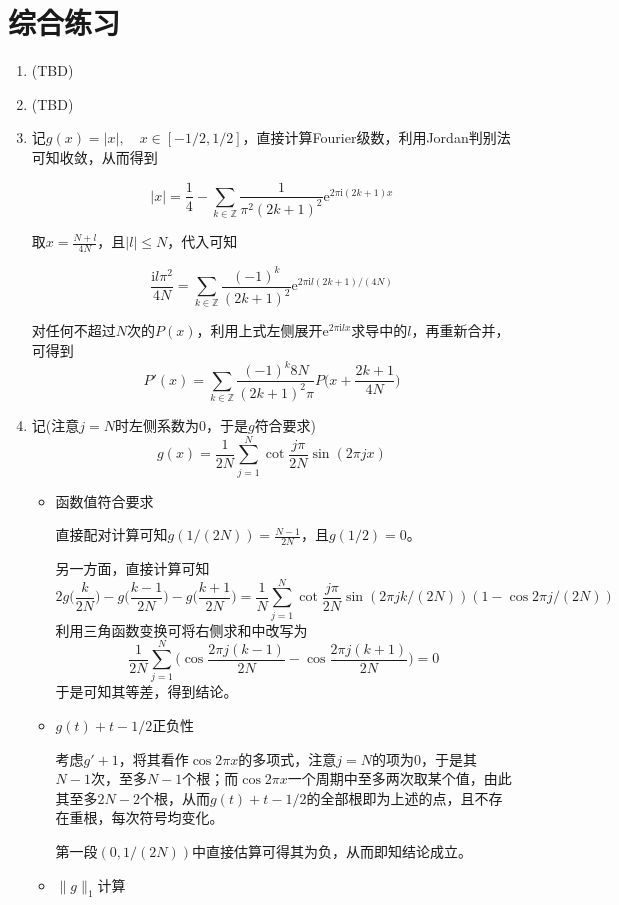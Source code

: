 \documentclass[a4paper,UTF8,fontset=windows]{ctexart}
\newcommand*{\er}{\mathrm{e}}
\newcommand*{\ir}{\mathrm{i}}
\begin{document}
\section{综合练习}
\begin{enumerate}
    \item (TBD)
    \item (TBD)
    \item 记$g(x)=|x|,\quad x\in[-1/2,1/2]$，直接计算Fourier级数，利用Jordan判别法可知收敛，从而得到

    $$|x|=\frac{1}{4}-\sum_{k\in\mathbb{Z}}\frac{1}{\pi^2(2k+1)^2}\er^{2\pi\ir(2k+1)x}$$

    取$x=\frac{N+l}{4N}$，且$|l|\le N$，代入可知

    $$\frac{\ir l\pi^2}{4N}=\sum_{k\in\mathbb{Z}}\frac{(-1)^k}{(2k+1)^2}\er^{2\pi\ir l(2k+1)/(4N)}$$

    对任何不超过$N$次的$P(x)$，利用上式左侧展开$\er^{2\pi\ir lx}$求导中的$l$，再重新合并，可得到
    $$P'(x)=\sum_{k\in\mathbb{Z}}\frac{(-1)^k8N}{(2k+1)^2\pi}P\bigg(x+\frac{2k+1}{4N}\bigg)$$
    
    \item 记(注意$j=N$时左侧系数为0，于是$g$符合要求)
    $$g(x)=\frac{1}{2N}\sum_{j=1}^N\cot\frac{j\pi}{2N}\sin(2\pi jx)$$

    \begin{itemize}
        \item 函数值符合要求
        
        直接配对计算可知$g(1/(2N))=\frac{N-1}{2N}$，且$g(1/2)=0$。

        另一方面，直接计算可知
        $$2g\bigg(\frac{k}{2N}\bigg)-g\bigg(\frac{k-1}{2N}\bigg)-g\bigg(\frac{k+1}{2N}\bigg)=\frac{1}{N}\sum_{j=1}^N\cot\frac{j\pi}{2N}\sin(2\pi j k/(2N))(1-\cos2\pi j/(2N))$$
        利用三角函数变换可将右侧求和中改写为
        $$\frac{1}{2N}\sum_{j=1}^N\bigg(\cos\frac{2\pi j(k-1)}{2N}-\cos\frac{2\pi j(k+1)}{2N}\bigg)=0$$
        于是可知其等差，得到结论。

        \item $g(t)+t-1/2$正负性
        
        考虑$g'+1$，将其看作$\cos2\pi x$的多项式，注意$j=N$的项为0，于是其$N-1$次，至多$N-1$个根；而$\cos 2\pi x$一个周期中至多两次取某个值，由此其至多$2N-2$个根，从而$g(t)+t-1/2$的全部根即为上述的点，且不存在重根，每次符号均变化。
        
        第一段$(0,1/(2N))$中直接估算可得其为负，从而即知结论成立。

        \item $\|g\|_1$计算
        

\end{itemize}
\end{enumerate}
\end{document}
